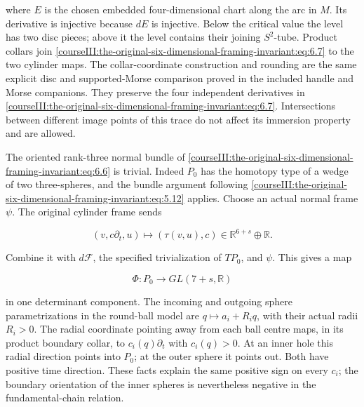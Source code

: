 where \(E\) is the chosen embedded four-dimensional chart along the arc in \(M\). Its derivative is injective because \(dE\) is injective. Below the critical value the level has two disc pieces; above it the level contains their joining \(S^2\)-tube. Product collars join \eqref{courseIII:the-original-six-dimensional-framing-invariant:eq:6.7} to the two cylinder maps. The collar-coordinate construction and rounding are the same explicit disc and supported-Morse comparison proved in the included handle and Morse companions. They preserve the four independent derivatives in \eqref{courseIII:the-original-six-dimensional-framing-invariant:eq:6.7}. Intersections between different image points of this trace do not affect its immersion property and are allowed.

The oriented rank-three normal bundle of \eqref{courseIII:the-original-six-dimensional-framing-invariant:eq:6.6} is trivial. Indeed \(P_0\) has the homotopy type of a wedge of two three-spheres, and the bundle argument following \eqref{courseIII:the-original-six-dimensional-framing-invariant:eq:5.12} applies. Choose an actual normal frame \(\psi\). The original cylinder frame sends

\begin{equation}
(v,c\partial_t,u)\longmapsto(\tau(v,u),c)
                    \in\mathbb R^{6+s}\oplus\mathbb R.
 \label{courseIII:the-original-six-dimensional-framing-invariant:eq:6.8}
\end{equation}

Combine it with \(d\mathcal F\), the specified trivialization of \(TP_0\), and \(\psi\). This gives a map

\begin{equation}
\Phi:P_0\longrightarrow GL(7+s,\mathbb R)
 \label{courseIII:the-original-six-dimensional-framing-invariant:eq:6.9}
\end{equation}

in one determinant component. The incoming and outgoing sphere parametrizations in the round-ball model are \(q\mapsto a_i+R_iq\), with their actual radii \(R_i>0\). The radial coordinate pointing away from each ball centre maps, in its product boundary collar, to \(c_i(q)\partial_t\) with \(c_i(q)>0\). At an inner hole this radial direction points into \(P_0\); at the outer sphere it points out. Both have positive time direction. These facts explain the same positive sign on every \(c_i\); the boundary orientation of the inner spheres is nevertheless negative in the fundamental-chain relation.

